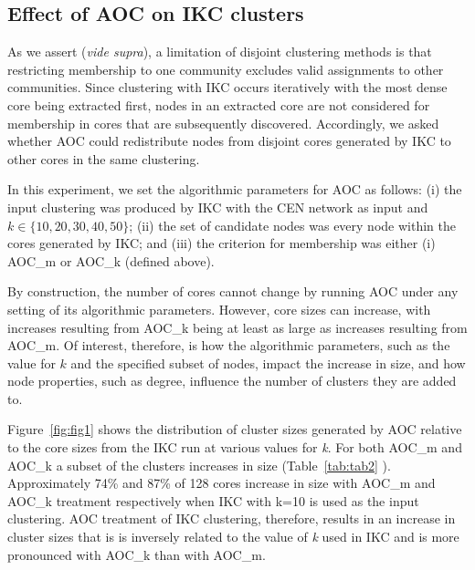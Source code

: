 \documentclass[12pt, oneside]{article}   	%
\begin{document}
\subsection{Effect of AOC on IKC clusters} 
As we assert (\emph{vide supra}), a limitation of disjoint clustering methods is that restricting membership to one community excludes valid assignments to other communities. Since clustering with IKC occurs iteratively with the most dense core being extracted first, nodes in an extracted core are not considered for membership in cores that are subsequently discovered. Accordingly, we asked whether AOC could redistribute nodes from disjoint cores generated by IKC to other cores in the same clustering.  

In this experiment,  we set the algorithmic parameters for AOC as follows: (i) the input clustering was produced by IKC with the CEN network as input and $k \in \{10, 20, 30, 40, 50\}$; (ii) the set of candidate nodes was every node within the cores generated by IKC; and (iii) the criterion for membership was either (i) AOC\_m or AOC\_k (defined above).

By construction, the number of cores cannot change by running AOC  under any setting of its algorithmic parameters. However, core sizes can increase, with increases resulting from AOC\_k being at least as large as increases resulting from AOC\_m.
Of interest, therefore, is how the algorithmic parameters, such as the value for $k$ and the specified subset of nodes, impact the increase in size, and how node properties, such as degree, influence the number of clusters they are added to.

Figure~\ref{fig:fig1} shows the distribution of cluster sizes generated by AOC relative to the core sizes from the IKC run at various values for \emph{k}. For both AOC\_m and AOC\_k a subset of the clusters increases in size (Table~\ref{tab:tab2} ).
Approximately 74\% and 87\% of  128 cores increase in size with AOC\_m and AOC\_k treatment respectively when IKC with k=10 is used as the input clustering. AOC treatment of IKC clustering, therefore, results in an increase in cluster sizes that is is inversely related to the value of \emph{k} used in IKC and is more pronounced with AOC\_k than with AOC\_m. 
\end{document}
